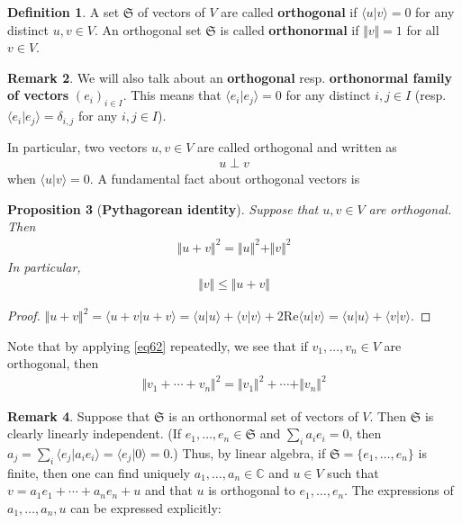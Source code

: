 \documentclass[12pt,b5paper,notitlepage]{article}
\theoremstyle{definition}
\newtheorem{df}{Definition}[section]
\newtheorem{rem}[df]{Remark}
\theoremstyle{plain}
\newtheorem{pp}[df]{Proposition}
\newcommand{\fk}{\mathfrak}
\newcommand{\bk}[1]{\langle {#1}\rangle}
\newcommand{\Cbb}{\mathbb C}
\newcommand{\Real}{\mathrm{Re}}
\numberwithin{equation}{section}
\begin{document}
\begin{df}
A set $\fk S$ of vectors of $V$ are called \textbf{orthogonal}  if $\bk{u|v}=0$ for any distinct $u,v\in V$. An orthogonal set $\fk S$ is called \textbf{orthonormal}  if $\Vert v\Vert=1$ for all $v\in V$. 
\end{df}

\begin{rem}
We will also talk about an \textbf{orthogonal} resp.  \textbf{orthonormal family of vectors} $(e_i)_{i\in I}$. This means that $\bk{e_i|e_j}=0$ for any distinct $i,j\in I$ (resp. $\bk{e_i|e_j}=\delta_{i,j}$ for any $i,j\in I$). 
\end{rem}

In particular, two vectors $u,v\in V$ are called orthogonal and written as 
\begin{align*}
u\perp v
\end{align*}
when $\bk{u|v}=0$. A fundamental fact about orthogonal vectors is
\begin{pp}[\textbf{Pythagorean identity}]
Suppose that $u,v\in V$ are orthogonal. Then
\begin{align}\label{eq62}
\Vert u+v\Vert^2=\Vert u\Vert^2+\Vert v\Vert^2
\end{align}
In particular,
\begin{align}\label{eq63}
\Vert v\Vert\leq\Vert u+v\Vert
\end{align}
\end{pp}


\begin{proof}
$\Vert u+v\Vert^2=\bk{u+v|u+v}=\bk{u|u}+\bk{v|v}+2\Real \bk{u|v}=\bk{u|u}+\bk{v|v}$.
\end{proof}


Note that by applying \eqref{eq62} repeatedly, we see that if $v_1,\dots,v_n\in V$ are orthogonal, then
\begin{align}\label{eq64}
\Vert v_1+\cdots+v_n\Vert^2=\Vert v_1\Vert^2+\cdots+\Vert v_n\Vert^2
\end{align}



\begin{rem}
Suppose that $\fk S$ is an orthonormal set of vectors of $V$. Then $\fk S$ is clearly linearly independent. (If $e_1,\dots,e_n\in\fk S$ and $\sum_i a_ie_i=0$, then $a_j=\sum_i\bk{e_j|a_ie_i}=\bk{e_j|0}=0$.) Thus, by linear algebra, if $\fk S=\{e_1,\dots,e_n\}$ is finite, then one can find uniquely $a_1,\dots,a_n\in\Cbb$ and $u\in V$ such that $v=a_1e_1+\cdots+a_ne_n+u$ and that $u$ is orthogonal to $e_1,\dots,e_n$. The expressions of $a_1,\dots,a_n,u$ can be expressed explicitly:
\end{rem}
\end{document}
